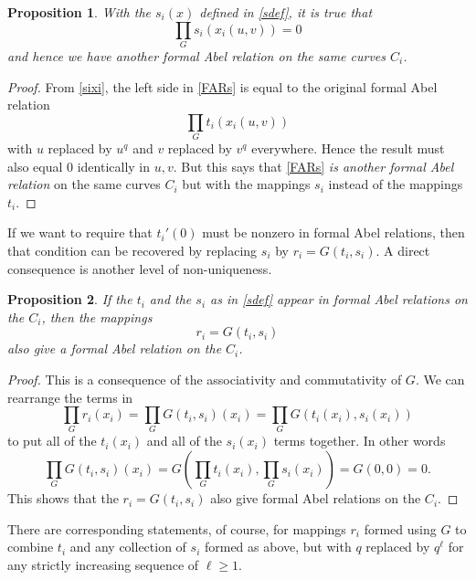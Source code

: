 \documentclass[12pt]{amsart}
\theoremstyle{theorem}
\newtheorem{prop}{Proposition}
\begin{document}
 \begin{prop}
 With the $s_i(x)$ defined in \eqref{sdef}, it is true that
 \begin{equation}
 \label{FARs}
 \prod_G s_i(x_i(u,v)) = 0
 \end{equation}
 and hence we have another formal Abel relation on the same curves $C_i$.
 \end{prop}
 
 \begin{proof}
From \eqref{sixi}, the left side in \eqref{FARs} is equal to the original formal Abel relation 
$$\prod_G t_i(x_i(u,v))$$
with $u$ replaced by $u^q$ and $v$ replaced by $v^q$
everywhere.   Hence the result must also equal $0$ identically in $u,v$.
But this says that  \eqref{FARs} \emph{is another formal Abel relation} on the same curves $C_i$ but with the mappings $s_i$
instead of the mappings $t_i$.         
 \end{proof}        
 
If we want to require that $t_i'(0)$ must be nonzero in formal Abel relations, then that condition can be recovered by 
replacing $s_i$ by $r_i = G(t_i, s_i)$.   A direct consequence is another level of non-uniqueness.  
 
 \begin{prop}  
 \label{Comp}
 If the $t_i$ and the $s_i$ as in \eqref{sdef} appear in
 formal Abel relations on the $C_i$, then the mappings
 $$r_i = G(t_i,s_i)$$
 also give a formal Abel relation on the $C_i$.
 \end{prop}           
 
 \begin{proof}  
 This is a consequence of the associativity and commutativity of $G$.  We can rearrange
 the terms in 
 $$\prod_G r_i(x_i) = \prod_G G(t_i,s_i) (x_i) = \prod_G G(t_i(x_i), s_i(x_i))$$
 to put all of the $t_i(x_i)$ and all of the $s_i(x_i)$ terms together.  In other words
 $$  \prod_G G(t_i, s_i) (x_i) = G\left( \prod_G t_i(x_i), \prod_G s_i(x_i)\right) = G(0,0) = 0.$$
 This shows that the $r_i = G(t_i, s_i)$ also give formal Abel relations on the $C_i$.
 \end{proof}
 
 There are corresponding statements, of course, for mappings $r_i$ formed using $G$ to  combine
 $t_i$ and any collection of $s_i$ formed as above, but with $q$ replaced by $q^\ell$ for any strictly
increasing sequence of $\ell \ge 1$.
 
\end{document}

